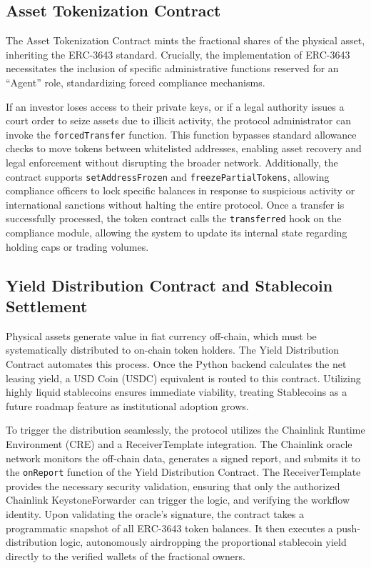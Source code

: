 \documentclass{Resources/bdlt-project}
\begin{document}
\subsection{Asset Tokenization Contract}
The Asset Tokenization Contract mints the fractional shares of the physical asset, inheriting the ERC-3643 standard. Crucially, the implementation of ERC-3643 necessitates the inclusion of specific administrative functions reserved for an ``Agent'' role, standardizing forced compliance mechanisms.

If an investor loses access to their private keys, or if a legal authority issues a court order to seize assets due to illicit activity, the protocol administrator can invoke the \texttt{forcedTransfer} function. This function bypasses standard allowance checks to move tokens between whitelisted addresses, enabling asset recovery and legal enforcement without disrupting the broader network. Additionally, the contract supports \texttt{setAddressFrozen} and \texttt{freezePartialTokens}, allowing compliance officers to lock specific balances in response to suspicious activity or international sanctions without halting the entire protocol. Once a transfer is successfully processed, the token contract calls the \texttt{transferred} hook on the compliance module, allowing the system to update its internal state regarding holding caps or trading volumes.

\subsection{Yield Distribution Contract and Stablecoin Settlement}
Physical assets generate value in fiat currency off-chain, which must be systematically distributed to on-chain token holders. The Yield Distribution Contract automates this process. Once the Python backend calculates the net leasing yield, a USD Coin (USDC) equivalent is routed to this contract. Utilizing highly liquid stablecoins ensures immediate viability, treating Stablecoins as a future roadmap feature as institutional adoption grows.

To trigger the distribution seamlessly, the protocol utilizes the Chainlink Runtime Environment (CRE) and a ReceiverTemplate integration. The Chainlink oracle network monitors the off-chain data, generates a signed report, and submits it to the \texttt{onReport} function of the Yield Distribution Contract. The ReceiverTemplate provides the necessary security validation, ensuring that only the authorized Chainlink KeystoneForwarder can trigger the logic, and verifying the workflow identity. Upon validating the oracle's signature, the contract takes a programmatic snapshot of all ERC-3643 token balances. It then executes a push-distribution logic, autonomously airdropping the proportional stablecoin yield directly to the verified wallets of the fractional owners.
\end{document}
